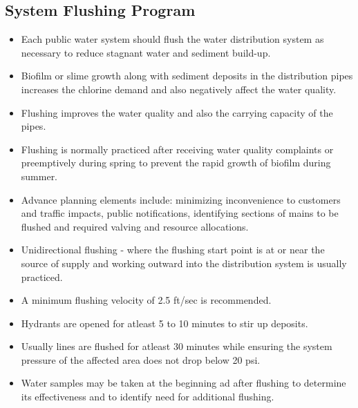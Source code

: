 \subsection{System Flushing Program} 
\begin{itemize}
\item Each public water system should flush the water distribution system as necessary to reduce stagnant water and sediment build-up.
\item Biofilm or slime growth along with sediment deposits in the distribution pipes increases the chlorine demand and also negatively affect the water quality.
\item Flushing improves the water quality and also the carrying capacity of the pipes.
\item Flushing is normally practiced after receiving water quality complaints or preemptively during spring to prevent the rapid growth of biofilm during summer.
\item Advance planning elements include: minimizing inconvenience to customers and traffic impacts, public notifications, identifying sections of mains to be flushed and required valving and resource allocations.
\item Unidirectional flushing - where the flushing start point is at or near the source of supply and working outward into the distribution system is usually practiced.
\item A minimum flushing velocity of 2.5 ft/sec is recommended.
\item Hydrants are opened for atleast 5 to 10 minutes to stir up deposits.
\item Usually lines are flushed for atleast 30 minutes while ensuring the system pressure of the affected area does not drop below 20 psi.
\item Water samples may be taken at the beginning ad after flushing to determine its effectiveness and to identify need for additional flushing.
\end{itemize}

